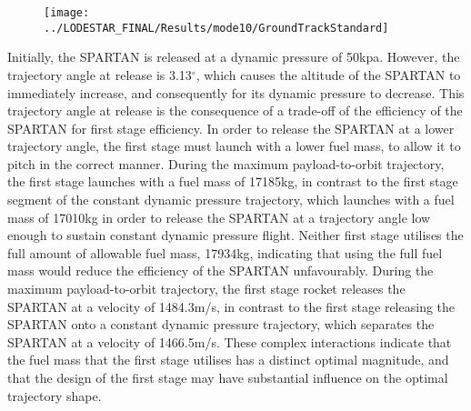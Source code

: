 \begin{figure}[ht]
	
	
	
	\centering
	\texttt{[image: ../LODESTAR\_FINAL/Results/mode10/GroundTrackStandard]}
	\caption{}
	\label{fig:GroundTrackStandardNoReturn}
\end{figure}

Initially, the SPARTAN is released at a dynamic pressure of 50kpa. However, the trajectory angle at release is 3.13$^\circ$, which causes the altitude of the SPARTAN to immediately increase, and consequently for its dynamic pressure to decrease. This trajectory angle at release is the consequence of a trade-off of the efficiency of the SPARTAN for first stage efficiency. In order to release the SPARTAN at a lower trajectory angle, the first stage must launch with a lower fuel mass, to allow it to pitch in the correct manner. During the maximum payload-to-orbit trajectory, the first stage launches with a fuel mass of 17185kg, in contrast to the first stage segment of the constant dynamic pressure trajectory, which launches with a fuel mass of 17010kg in order to release the SPARTAN at a trajectory angle low enough to sustain constant dynamic pressure flight. Neither first stage utilises the full amount of allowable fuel mass, 17934kg, indicating that using the full fuel mass would reduce the efficiency of the SPARTAN unfavourably. 
During the maximum payload-to-orbit trajectory, the first stage rocket releases the SPARTAN at a velocity of 1484.3m/s, in contrast to the first stage releasing the SPARTAN onto a constant dynamic pressure trajectory, which separates the SPARTAN at a velocity of 1466.5m/s. 
These complex interactions indicate that the fuel mass that the first stage utilises has a distinct optimal magnitude, and that the design of the first stage may have substantial influence on the optimal trajectory shape. 

